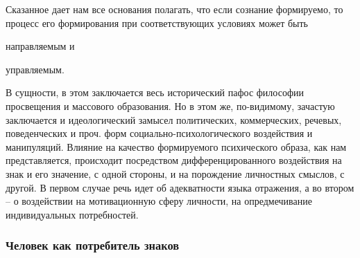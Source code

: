 Сказанное дает нам все основания полагать, что если сознание формируемо,
то процесс его формирования при соответствующих условиях может быть
\begin{enumerate*}[label=\asbuk*)]
\item направляемым и
\item управляемым.
\end{enumerate*} В сущности, в этом заключается весь исторический пафос
философии просвещения и массового образования. Но в этом же, по-видимому,
зачастую заключается и идеологический замысел политических, коммерческих,
речевых, поведенческих и проч. форм социально-психологического воздействия и
манипуляций. Влияние на качество формируемого психического образа, как нам
представляется, происходит посредством дифференцированного воздействия на
знак и его значение, с одной стороны, и на порождение личностных смыслов, с другой.
В первом случае речь идет об адекватности языка отражения, а во втором --
о воздействии на мотивационную сферу личности, на опредмечивание индивидуальных
потребностей.

\subsubsection{Человек как потребитель знаков}

